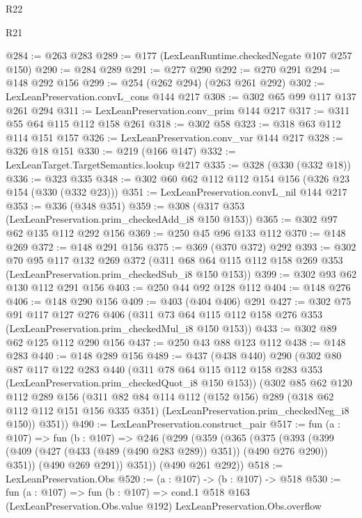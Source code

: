 \begin{lexlean}{R22}
\begin{lexlean}{R21}
\begin{coremodule}
{{{{{@284 := @263 @283
@289 := @177 (LexLeanRuntime.checkedNegate @107 @257 @150)
@290 := @284 @289
@291 := @277 @290
@292 := @270 @291
@294 := @148 @292 @156
@299 := @254 (@262 @294) (@263 @261 @292)
@302 := LexLeanPreservation.convL_cons @144 @217
@308 := @302 @65 @99 @117 @137 @261 @294
@311 := LexLeanPreservation.conv_prim @144 @217
@317 := @311 @55 @64 @115 @112 @158 @261
@318 := @302 @58
@323 := @318 @63 @112 @114 @151 @157
@326 := LexLeanPreservation.conv_var @144 @217
@328 := @326 @18 @151
@330 := @219 (@166 @147)
@332 := LexLeanTarget.TargetSemantics.lookup @217
@335 := @328 (@330 (@332 @18))
@336 := @323 @335
@348 := @302 @60 @62 @112 @112 @154 @156 (@326 @23 @154 (@330 (@332 @23)))
@351 := LexLeanPreservation.convL_nil @144 @217
@353 := @336 (@348 @351)
@359 := @308 (@317 @353 (LexLeanPreservation.prim_checkedAdd_i8 @150 @153))
@365 := @302 @97 @62 @135 @112 @292 @156
@369 := @250 @45 @96 @133 @112
@370 := @148 @269
@372 := @148 @291 @156
@375 := @369 (@370 @372) @292
@393 := @302
    @70
    @95
    @117
    @132
    @269
    @372
    (@311 @68 @64 @115 @112 @158 @269 @353 (LexLeanPreservation.prim_checkedSub_i8 @150 @153))
@399 := @302 @93 @62 @130 @112 @291 @156
@403 := @250 @44 @92 @128 @112
@404 := @148 @276
@406 := @148 @290 @156
@409 := @403 (@404 @406) @291
@427 := @302
    @75
    @91
    @117
    @127
    @276
    @406
    (@311 @73 @64 @115 @112 @158 @276 @353 (LexLeanPreservation.prim_checkedMul_i8 @150 @153))
@433 := @302 @89 @62 @125 @112 @290 @156
@437 := @250 @43 @88 @123 @112
@438 := @148 @283
@440 := @148 @289 @156
@489 := @437
    (@438 @440)
    @290
    (@302
      @80
      @87
      @117
      @122
      @283
      @440
      (@311 @78 @64 @115 @112 @158 @283 @353 (LexLeanPreservation.prim_checkedQuot_i8 @150 @153))
      (@302
        @85
        @62
        @120
        @112
        @289
        @156
        (@311
          @82
          @84
          @114
          @112
          (@152 @156)
          @289
          (@318 @62 @112 @112 @151 @156 @335 @351)
          (LexLeanPreservation.prim_checkedNeg_i8 @150))
        @351))
@490 := LexLeanPreservation.construct_pair
@517 := fun (a : @107) =>
  fun (b : @107) =>
  @246
    (@299
      (@359
        (@365
          (@375
            (@393 (@399 (@409 (@427 (@433 (@489 (@490 @283 @289)) @351)) (@490 @276 @290)) @351))
            (@490 @269 @291))
          @351))
      (@490 @261 @292))
@518 := LexLeanPreservation.Obs
@520 := (a : @107) -> (b : @107) -> @518
@530 := fun (a : @107) =>
  fun (b : @107) =>
  cond.{1} @518 @163 (LexLeanPreservation.Obs.value @192) LexLeanPreservation.Obs.overflow
}}}}}
\end{coremodule}
\end{lexlean}
\end{lexlean}
